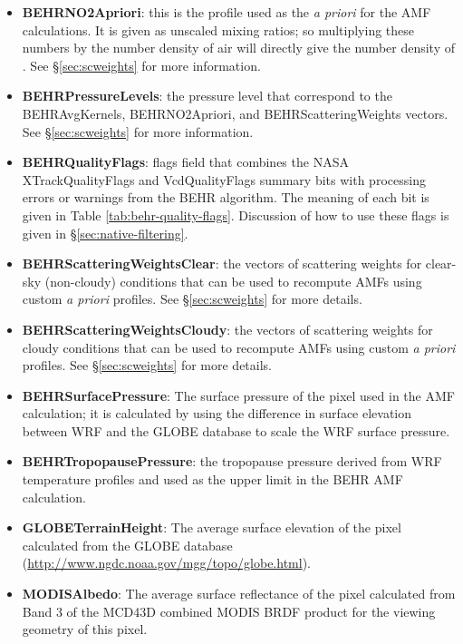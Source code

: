 \documentclass[12pt]{article}
\begin{document}
\begin{itemize}
	\item \textbf{BEHRNO2Apriori}: this is the  profile used as the \emph{a priori} for the AMF calculations. It is given as unscaled mixing ratios; so multiplying these numbers by the number density of air will directly give the number density of . See \S\ref{sec:scweights} for more information.
	
	\item \textbf{BEHRPressureLevels}: the pressure level that correspond to the BEHRAvgKernels, BEHRNO2Apriori, and BEHRScatteringWeights vectors. See \S\ref{sec:scweights} for more information.
	
	\item \textbf{BEHRQualityFlags}: flags field that combines the NASA XTrackQualityFlags and VcdQualityFlags summary bits with processing errors or warnings from the BEHR algorithm. The meaning of each bit is given in Table \ref{tab:behr-quality-flags}. Discussion of how to use these flags is given in \S\ref{sec:native-filtering}.
	
	\item \textbf{BEHRScatteringWeightsClear}: the vectors of scattering weights for clear-sky (non-cloudy) conditions that can be used to recompute AMFs using custom \emph{a priori} profiles. See \S\ref{sec:scweights} for more details.
	
	\item \textbf{BEHRScatteringWeightsCloudy}: the vectors of scattering weights for cloudy conditions that can be used to recompute AMFs using custom \emph{a priori} profiles. See \S\ref{sec:scweights} for more details.
	
	\item \textbf{BEHRSurfacePressure}: The surface pressure of the pixel used in the AMF calculation; it is calculated by using the difference in surface elevation between WRF and the GLOBE database to scale the WRF surface pressure.
	
	\item \textbf{BEHRTropopausePressure}: the tropopause pressure derived from WRF temperature profiles and used as the upper limit in the BEHR AMF calculation.
	
	\item \textbf{GLOBETerrainHeight}: The average surface elevation of the pixel calculated from the GLOBE database (\url{http://www.ngdc.noaa.gov/mgg/topo/globe.html}). 
	
	
	\item \textbf{MODISAlbedo}: The average surface reflectance of the pixel calculated from Band 3 of the MCD43D combined MODIS BRDF product for the viewing geometry of this pixel. 
	

\end{itemize}
\end{document}

